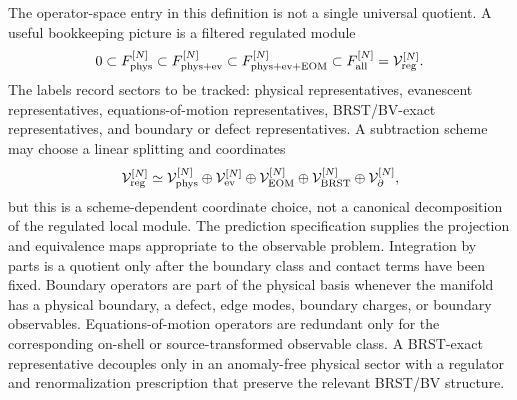 The operator-space entry in this definition is not a single universal
quotient.  A useful bookkeeping picture is a filtered regulated module
\[
  0
  \subset
  F_{\rm phys}^{[N]}
  \subset
  F_{\rm phys+ev}^{[N]}
  \subset
  F_{\rm phys+ev+EOM}^{[N]}
  \subset
  F_{\rm all}^{[N]}
  =
  \mathcal V_{\rm reg}^{[N]} .
\]
The labels record sectors to be tracked: physical representatives,
evanescent representatives, equations-of-motion representatives, BRST/BV-exact
representatives, and boundary or defect representatives.  A subtraction scheme
may choose a linear splitting and coordinates
\[
  \mathcal V_{\rm reg}^{[N]}
  \simeq
  \mathcal V_{\rm phys}^{[N]}
  \oplus
  \mathcal V_{\rm ev}^{[N]}
  \oplus
  \mathcal V_{\rm EOM}^{[N]}
  \oplus
  \mathcal V_{\rm BRST}^{[N]}
  \oplus
  \mathcal V_{\partial}^{[N]},
\]
but this is a scheme-dependent coordinate choice, not a canonical
decomposition of the regulated local module.  The prediction specification
supplies the projection and equivalence maps appropriate to the observable
problem.
Integration by parts is a quotient only after the boundary class and contact
terms have been fixed.  Boundary operators are part of the physical basis
whenever the manifold has a physical boundary, a defect, edge modes, boundary
charges, or boundary observables.  Equations-of-motion operators are redundant
only for the corresponding on-shell or source-transformed observable class.  A
BRST-exact representative decouples only in an anomaly-free physical sector
with a regulator and renormalization prescription that preserve the relevant
BRST/BV structure.

